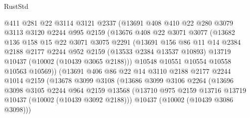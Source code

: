 \begin{lexlean}{RustStd}
\begin{coremodule}
                    @411
                    @281
                    @22
                    @3114
                    @3121
                    @2337
                    (@13691
                      @408
                      @410
                      @22
                      @280
                      @3079
                      @3113
                      @3120
                      @2244
                      @995
                      @2159
                      (@13676
                        @408
                        @22
                        @3071
                        @3077
                        (@13682
                          @136
                          @158
                          @15
                          @22
                          @3071
                          @3075
                          @2291
                          (@13691
                            @156
                            @86
                            @11
                            @14
                            @2384
                            @2188
                            @2177
                            @2244
                            @952
                            @2159
                            (@13533 @2384 @13537 @10893)
                            @13719
                            @10437
                            (@10002 (@10439 @3065 @2188)))
                          @10548
                          @10551
                          @10554
                          @10558
                          @10563
                          @10569))
                      (@13691
                        @406
                        @86
                        @22
                        @14
                        @3110
                        @2188
                        @2177
                        @2244
                        @1014
                        @2159
                        (@13678
                          @3099
                          @3108
                          (@13686
                            @3099
                            @3106
                            @2264
                            (@13696
                              @3098
                              @3105
                              @2244
                              @964
                              @2159
                              @13568
                              (@13710 @975 @2159 @13716 @13719 @10437 (@10002 (@10439 @3092 @2188)))
                              @10437
                              (@10002 (@10439 @3086 @3098)))

\end{coremodule}
\end{lexlean}
